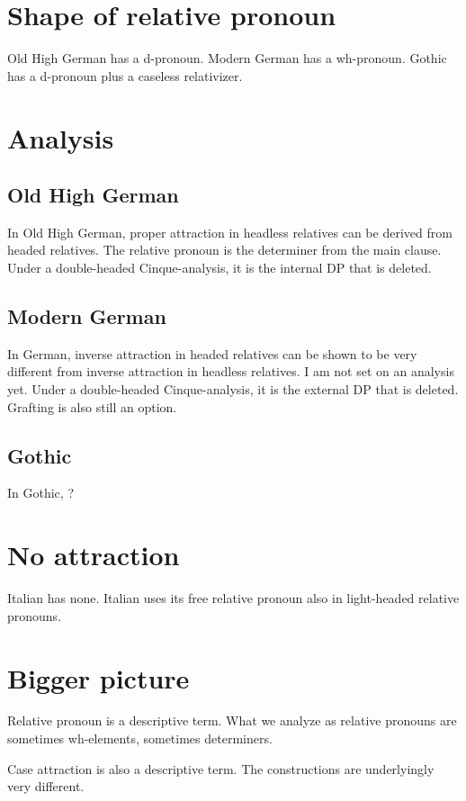   \section{Shape of relative pronoun}
Old High German has a d-pronoun. Modern German has a wh-pronoun. Gothic has a d-pronoun plus a caseless relativizer.

  \section{Analysis}

    \subsection{Old High German}
In Old High German, proper attraction in headless relatives can be derived from headed relatives. The relative pronoun is the determiner from the main clause. Under a double-headed Cinque-analysis, it is the internal DP that is deleted.

    \subsection{Modern German}
In German, inverse attraction in headed relatives can be shown to be very different from inverse attraction in headless relatives. I am not set on an analysis yet. Under a double-headed Cinque-analysis, it is the external DP that is deleted. Grafting is also still an option.

    \subsection{Gothic}
In Gothic, ?


\section{No attraction}
Italian has none. Italian uses its free relative pronoun also in light-headed relative pronouns.


  \section{Bigger picture}
Relative pronoun is a descriptive term. What we analyze as relative pronouns are sometimes wh-elements, sometimes determiners.

Case attraction is also a descriptive term. The constructions are underlyingly very different.
